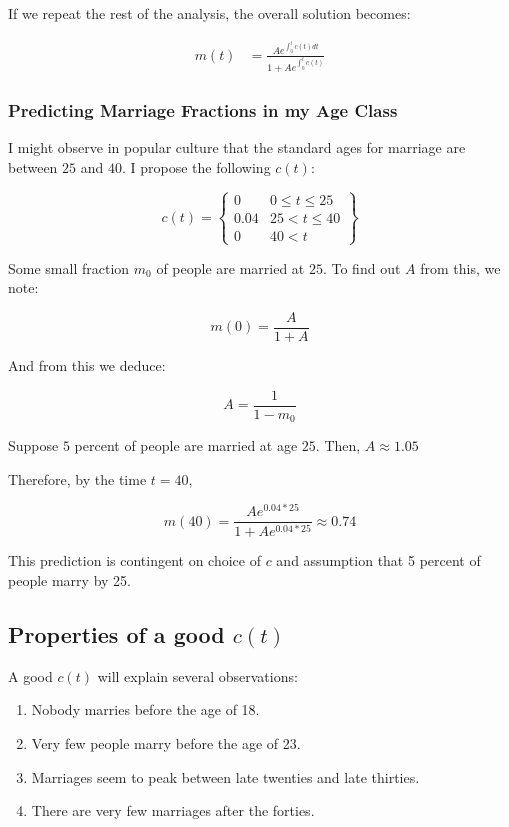 \documentclass{article}
\begin{document}
If we repeat the rest of the analysis, the overall solution becomes:

\begin{align}
	m(t) & = \frac{A e^{\int_0^t c(t) dt}}{1 + A e^{\int_0^t c(t)}}
\end{align}

\subsubsection{Predicting Marriage Fractions in my Age Class}

I might observe in popular culture that the standard ages for marriage
	are between $25$ and $40$.
I propose the following $c(t)$:

\[ c(t) = \left\{ 
	\begin{array}{cc} 
			0 & 0 \leq t \leq 25 \\ 
			0.04 & 25 < t \leq 40 \\
			0 & 40 < t
	\end{array} \right\} \]

Some small fraction $m_0$ of people are married at $25$.
To find out $A$ from this, we note:

\[ m(0) = \frac{A}{1 + A} \]

And from this we deduce:

\[ A = \frac{1}{1 - m_0} \]

Suppose $5$ percent of people are married at age $25$.
Then, $A \approx 1.05$

Therefore, by the time $t = 40$,

\[ m(40) = \frac{A e^{0.04 * 25}}{1 + A e^{0.04 * 25}} \approx 0.74
\]

This prediction is contingent on choice of $c$ and assumption that 5
	percent of people marry by 25.

\subsection{Properties of a good $c(t)$}

A good $c(t)$ will explain several observations:

\begin{enumerate}
	\item Nobody marries before the age of 18.
	\item Very few people marry before the age of 23.
	\item Marriages seem to peak between late twenties
		and late thirties.
	\item There are very few marriages after the forties.
\end{enumerate}
\end{document}
